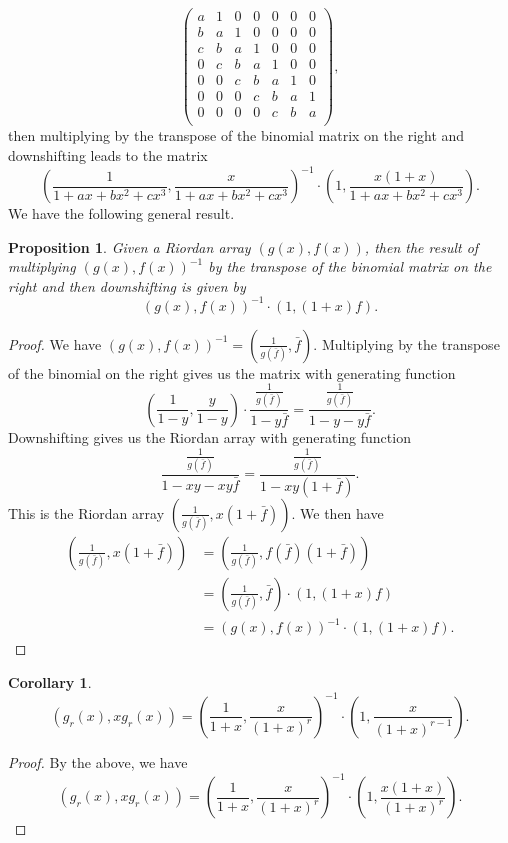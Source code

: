 \documentclass[12pt,reqno]{article}
\newtheorem{proposition}[theorem]{Proposition}
\newtheorem{corollary}[theorem]{Corollary}
\theoremstyle{definition}
\begin{document}
$$\left(
\begin{array}{ccccccc}
a & 1 & 0 & 0 & 0 & 0 & 0 \\
b & a & 1 & 0 & 0 & 0 & 0 \\
c & b & a & 1 & 0 & 0 & 0 \\
0 & c & b & a & 1 & 0 & 0 \\
0 & 0 & c & b & a & 1 & 0 \\
0 & 0 & 0 & c & b & a & 1 \\
0 & 0 & 0 & 0 & c & b & a \\
\end{array}\right),$$ then multiplying by the transpose of the binomial matrix on the right and downshifting leads to the matrix 
$$\left(\frac{1}{1+ax+bx^2+cx^3}, \frac{x}{1+ax+bx^2+cx^3}\right)^{-1}\cdot \left(1, \frac{x(1+x)}{1+ax+bx^2+cx^3}\right).$$
We have the following general result.
\begin{proposition} Given a Riordan array $(g(x), f(x))$, then the result of multiplying $(g(x), f(x))^{-1}$ by the transpose of the binomial matrix on the right and then downshifting is given by 
$$(g(x), f(x))^{-1} \cdot (1, (1+x)f).$$ 
\end{proposition}
\begin{proof} We have $(g(x), f(x))^{-1}=\left(\frac{1}{g(\bar{f})}, \bar{f}\right)$. Multiplying by the transpose of the binomial on the right gives us the matrix with generating function 
$$ \left(\frac{1}{1-y}, \frac{y}{1-y}\right)\cdot \frac{\frac{1}{g(\bar{f})}}{1-y \bar{f}}=\frac{\frac{1}{g(\bar{f})}}{1-y-y\bar{f}}.$$ 
Downshifting gives us the Riordan array with generating function 
$$\frac{\frac{1}{g(\bar{f})}}{1-xy-xy\bar{f}}=\frac{\frac{1}{g(\bar{f})}}{1-xy(1+\bar{f})}.$$ 
This is the Riordan array $\left(\frac{1}{g(\bar{f})}, x(1+\bar{f})\right)$. We then have 
\begin{align*} \left(\frac{1}{g(\bar{f})}, x(1+\bar{f})\right)&=\left(\frac{1}{g(\bar{f})}, f(\bar{f})(1+\bar{f})\right)\\
&=\left(\frac{1}{g(\bar{f})}, \bar{f}\right)\cdot (1, (1+x)f)\\
&=(g(x), f(x))^{-1} \cdot (1, (1+x)f).\end{align*}
\end{proof}
\begin{corollary} $$(g_r(x), x g_r(x))=\left(\frac{1}{1+x}, \frac{x}{(1+x)^r}\right)^{-1} \cdot \left(1, \frac{x}{(1+x)^{r-1}}\right).$$
\end{corollary}
\begin{proof} By the above, we have 
$$(g_r(x), x g_r(x))=\left(\frac{1}{1+x}, \frac{x}{(1+x)^r}\right)^{-1} \cdot \left(1, \frac{x(1+x)}{(1+x)^{r}}\right).$$
\end{proof}
\end{document}
